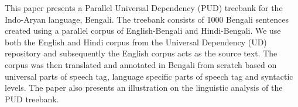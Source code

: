 This paper presents a Parallel Universal Dependency (PUD) treebank for the Indo-Aryan language, Bengali. The treebank consists of 1000 Bengali sentences created using a parallel corpus of English-Bengali and Hindi-Bengali. We use both the English and Hindi corpus from the Universal Dependency (UD) repository and subsequently the English corpus acts as the source text. The corpus was then translated and annotated in Bengali from scratch based on universal parts of speech tag, language specific parts of speech tag and syntactic levels. The paper also presents an illustration on the linguistic analysis of the PUD treebank.

